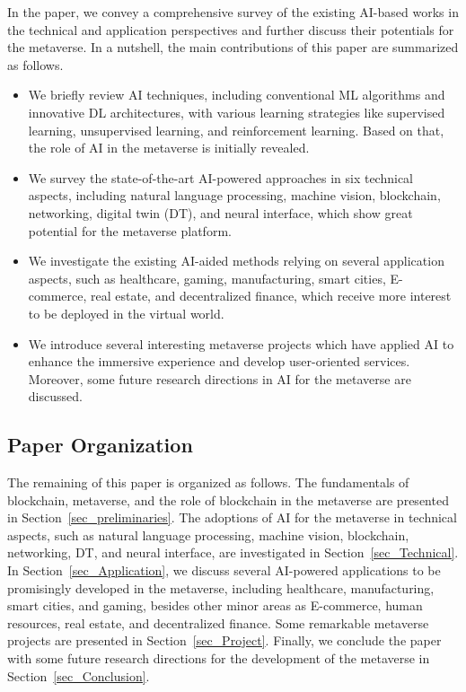 \documentclass[journal]{IEEEtran}
\begin{document}
In the paper, we convey a comprehensive survey of the existing AI-based works in the technical and application perspectives and further discuss their potentials for the metaverse. In a nutshell, the main contributions of this paper are summarized as follows.
\begin{itemize}
	\item We briefly review AI techniques, including conventional ML algorithms and innovative DL architectures, with various learning strategies like supervised learning, unsupervised learning, and reinforcement learning. Based on that, the role of AI in the metaverse is initially revealed. 
	\item We survey the state-of-the-art AI-powered approaches in six technical aspects, including natural language processing, machine vision, blockchain, networking, digital twin (DT), and neural interface, which show great potential for the metaverse platform.
	\item We investigate the existing AI-aided methods relying on several application aspects, such as healthcare, gaming, manufacturing, smart cities, E-commerce, real estate, and decentralized finance, which receive more interest to be deployed in the virtual world.
	\item We introduce several interesting metaverse projects which have applied AI to enhance the immersive experience and develop user-oriented services. Moreover, some future research directions in AI for the metaverse are discussed.
\end{itemize}


\subsection{Paper Organization}
The remaining of this paper is organized as follows. The fundamentals of blockchain, metaverse, and the role of blockchain in the metaverse are presented in Section~\ref{sec_preliminaries}. 
The adoptions of AI for the metaverse in technical aspects, such as natural language processing, machine vision, blockchain, networking, DT, and neural interface, are investigated in Section~\ref{sec_Technical}. 
In Section~\ref{sec_Application}, we discuss several AI-powered applications to be promisingly developed in the metaverse, including healthcare, manufacturing, smart cities, and gaming, besides other minor areas as E-commerce, human resources, real estate, and decentralized finance.
Some remarkable metaverse projects are presented in Section~\ref{sec_Project}.
Finally, we conclude the paper with some future research directions for the development of the metaverse in Section~\ref{sec_Conclusion}.
\end{document}

